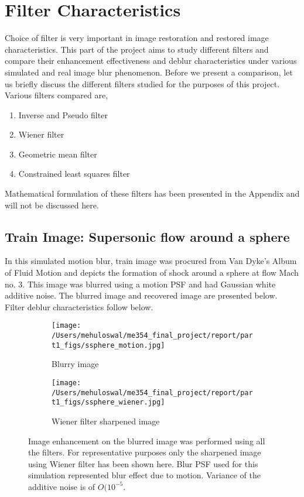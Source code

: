 \graphicspath{{put_your_path/}}%

\chapter{Filter Characteristics}
 Choice of filter is very important in image restoration and restored image characteristics. This part of the project aims to study different filters and compare their enhancement effectiveness and deblur characteristics under various simulated and real image blur phenomenon. Before we present a comparison, let us briefly discuss the different filters studied for the purposes of this project. Various filters compared are, 
\begin{enumerate}
\item Inverse and Pseudo filter
\item Wiener filter
\item Geometric mean filter
\item Constrained least squares filter
\end{enumerate} 
Mathematical formulation of these filters has been presented in the Appendix and will not be discussed here. 
\section{Train Image: Supersonic flow around a sphere}
In this simulated motion blur, train image was procured from Van Dyke's Album of Fluid Motion and depicts the formation of shock around a sphere at flow Mach no. 3. This image was blurred using a motion PSF and had Gaussian white additive noise. The blurred image and recovered image are presented below. Filter deblur characteristics follow below.

\begin{figure}
        \centering
        \begin{subfigure}[b]{0.4\textwidth}
                \centering
                \texttt{[image: /Users/mehuloswal/me354\_final\_project/report/part1\_figs/ssphere\_motion.jpg]}
                \caption{Blurry image}
                
        \end{subfigure}
        \begin{subfigure}[b]{0.4\textwidth}
                \centering
                \texttt{[image: /Users/mehuloswal/me354\_final\_project/report/part1\_figs/ssphere\_wiener.jpg]}
                \caption{Wiener filter sharpened image} 
        \end{subfigure}
\caption{Image enhancement on the blurred image was performed using all the filters. For representative purposes only the sharpened image using Wiener filter has been shown here. Blur PSF used for this simulation represented blur effect due to motion. Variance of the additive noise is of $O(10^{-5}$. }
\end{figure}

